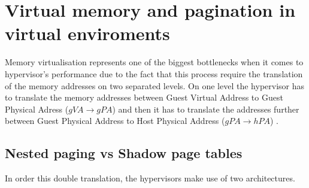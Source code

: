 \section{Virtual memory and pagination in virtual enviroments}
Memory virtualisation represents one of the biggest bottlenecks when it comes to hypervisor's performance due to the fact that this process require the translation of the memory addresses on two separated levels. On one level the hypervisor has to translate the memory addresses between Guest Virtual Address to Guest Physical Adress ($gVA \rightarrow gPA$) and then it has to translate the addresses further between Guest Physical Address to Host Physical Address ($gPA \rightarrow hPA$) \cite{agile-paging}. 

\subsection{Nested paging vs Shadow page tables}
In order this double translation, the hypervisors make use of two architectures.
